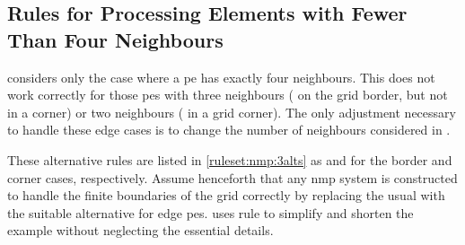\subsection{\label{sec:nmp:ruleslessthanfour}Rules for  Processing Elements with Fewer Than Four Neighbours}

 considers only the case where a \gls{pe} has exactly four neighbours.  This does not work correctly for those \glspl{pe} with three neighbours (\ie{} on the grid border, but not in a corner) or two neighbours (\ie{} in a grid corner).  The only adjustment necessary to handle these edge cases is to change the number of neighbours considered in .

These alternative rules are listed in \cref{ruleset:nmp:3alts} as {} and {} for the border and corner cases, respectively.  Assume henceforth that any \gls{nmp} system is constructed to handle the finite boundaries of the grid correctly by replacing the usual  with the suitable alternative for edge \glspl{pe}.   uses rule {} to simplify and shorten the example without neglecting the essential details.

\begin{cprulesetfloat}
    \begin{cpruleset}
        
        \\
        
        
    \end{cpruleset}
    \caption[Alternative forms of \cref{ruleset:nmp:proxspec}'s Rule 1]{\label{ruleset:nmp:3alts}Alternative forms of \cref{ruleset:nmp:proxspec}'s  for \glspl{pe} on the border of a grid or in the corner of a grid, respectively}
\end{cprulesetfloat}

